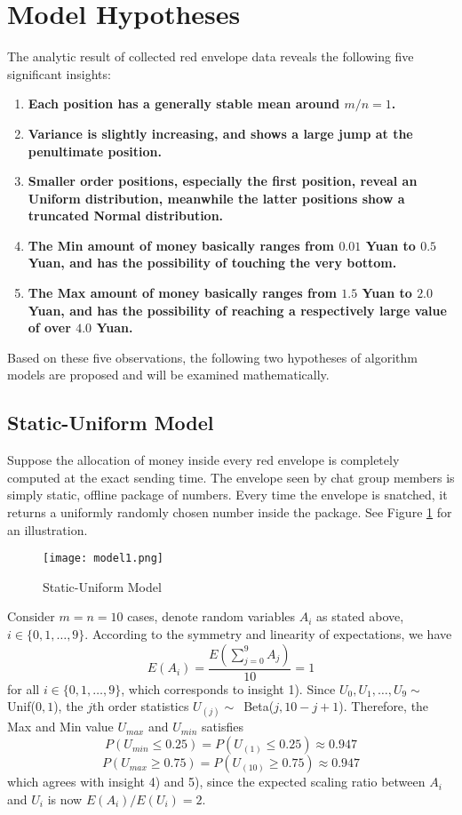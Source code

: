 \documentclass[10pt,journal]{IEEEtran}
\begin{document}
\section{Model Hypotheses}
The analytic result of collected red envelope data reveals the following five significant insights:
\begin{enumerate}
	\item \textbf{Each position has a generally stable mean around $m/n = 1$.}
	\item \textbf{Variance is slightly increasing, and shows a large jump at the penultimate position.}
	\item \textbf{Smaller order positions, especially the first position, reveal an Uniform distribution, meanwhile the latter positions show a truncated Normal distribution.}
	\item \textbf{The Min amount of money basically ranges from $0.01$ Yuan to $0.5$ Yuan, and has the possibility of touching the very bottom.}
	\item \textbf{The Max amount of money basically ranges from $1.5$ Yuan to $2.0$ Yuan, and has the possibility of reaching a respectively large value of over $4.0$ Yuan.}
\end{enumerate}
Based on these five observations, the following two hypotheses of algorithm models are proposed and will be examined mathematically. 
\subsection{Static-Uniform Model}
Suppose the allocation of money inside every red envelope is completely computed at the exact sending time. The envelope seen by chat group members is simply static, offline package of numbers. Every time the envelope is snatched, it returns a uniformly randomly chosen number inside the package. See Figure \ref{fig:model1} for an illustration.
\begin{figure}[H]
	\centering
	\texttt{[image: model1.png]}
	\caption{Static-Uniform Model} \label{fig:model1}
\end{figure}
Consider $m = n = 10$ cases, denote random variables $A_i$ as stated above, $i \in \{0, 1, \dots ,9\}$. According to the symmetry and linearity of expectations, we have
\[
	E(A_i) = \frac{E(\sum_{j=0}^{9} A_j)}{10} = 1
\]
for all $i \in \{0, 1, \dots ,9\}$, which corresponds to insight 1). Since $U_0, U_1, \dots , U_9 \sim$ Unif($0, 1$), the $j$th order statistics $U_{(j)} \sim$~Beta($j, 10-j+1$). Therefore, the Max and Min value $U_{max}$ and $U_{min}$ satisfies
\[
	P(U_{min} \le 0.25) = P(U_{(1)} \le 0.25) \approx 0.947
\]
\[
	P(U_{max} \ge 0.75) = P(U_{(10)} \ge 0.75) \approx 0.947
\]
which agrees with insight 4) and 5), since the expected scaling ratio between $A_i$ and $U_i$ is now $E(A_i)/E(U_i) = 2$. \\
\end{document}
